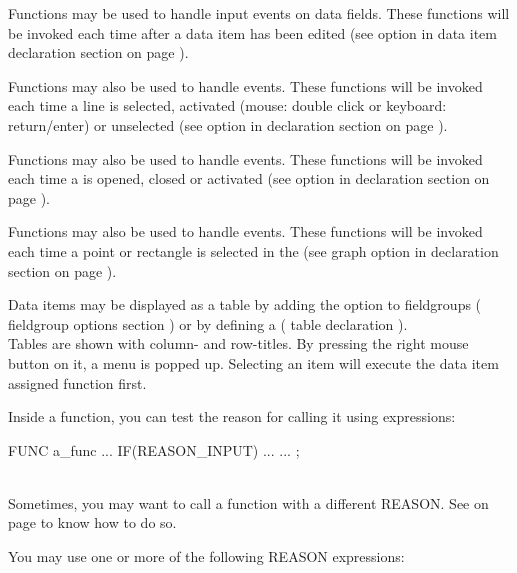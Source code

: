 Functions may be used to handle input events on data fields. These functions will be invoked each time after
  a data item has been edited (see \FUNC{} option in \DATAPOOL{} data item declaration
  section  on page \pageref{sec:dpitem}).

Functions may also be used to handle \LIST{} events. These functions will be invoked each time a
  line is selected, activated (mouse: double click or keyboard: return/enter) or unselected (see \FUNC{}
  option in \LIST{} declaration section  on page \pageref{dia:uilistoptionlist}).

Functions may also be used to handle \FORM{} events. These functions will be invoked each time a \FORM{}
  is opened, closed or activated (see \FUNC{} option in \FORM{} declaration section
   on page \pageref{dia:uiformoptionlist}).

Functions may also be used to handle \PLOTTWOD{} events. These functions will be invoked each time a
  point or rectangle is selected in the \PLOTTWOD{} (see graph option \FUNC{} in \PLOTTWOD{} declaration
  section  on page \pageref{dia:uiplot2dgraphoption}).

Data items may be displayed as a table by adding the \TABLESIZE{} option to fieldgroups
  (\UIMANAGER{} fieldgroup options section ) or by defining a \TABLE{}
  (\UIMANAGER{} table declaration ). \\
Tables are shown with column- and row-titles. By pressing the right mouse button on it, a menu is popped up.
Selecting an item will execute the data item assigned function first.

Inside a function, you can test the reason for calling it using \REASON{} expressions:

\begin{boxedminipage}[t]{\linewidth}
\begin{intens}
  FUNC a_func {
    ...
    IF(REASON_INPUT) {
      ...
    }
    ...
  };
\end{intens}
\end{boxedminipage} \\[2ex]

Sometimes, you may want to call a function with a different REASON.
See  on page \pageref{dia:setfuncstatement} to know
how to do so.

You may use one or more of the following REASON expressions:

